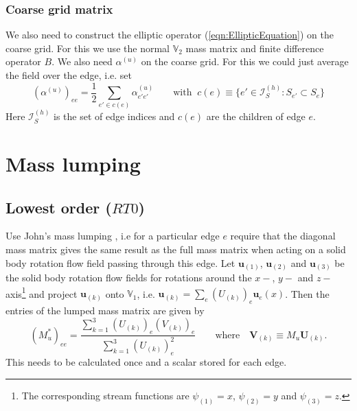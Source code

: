 \documentclass[12pt]{article}
\renewcommand{\vec}[1]{\boldsymbol{#1}}
\newcommand{\Vpressure}{\mathbb{V}_2}
\newcommand{\Vvelocity}{\mathbb{V}_1}
\newcommand{\indexSet}{\mathcal{I}}
\begin{document}
\subsubsection{Coarse grid matrix}
We also need to construct the elliptic operator (\ref{eqn:EllipticEquation}) on the coarse grid. For this we use the normal $\Vpressure$ mass matrix and finite difference operator $B$. We also need $\alpha^{(u)}$ on the coarse grid. For this we could just average the field over the edge, i.e. set
\begin{equation}
  \left(\alpha^{(u)}\right)_{ee} = \frac{1}{2} \sum_{e'\in c(e)}\alpha^{(u)}_{e'e'} \qquad\text{with}\;\;c(e) \equiv \{e'\in \indexSet_S^{(h)}:S_{e'}\subset S_{e}\}
\end{equation}
Here $\indexSet_S^{(h)}$ is the set of edge indices and $c(e)$ are the children of edge $e$.
\appendix
\section{Mass lumping}\label{sec:MassLumping}

\subsection{Lowest order ($RT0$)}
Use John's mass lumping \cite{Thuburn2013}, i.e for a particular edge $e$ require that the diagonal mass matrix gives the same result as the full mass matrix when acting on a solid body rotation flow field passing through this edge. Let $\vec{u}_{(1)}$, $\vec{u}_{(2)}$ and $\vec{u}_{(3)}$ be the solid body rotation flow fields for rotations around the $x-$, $y-$ and $z-$ axis\footnote{The corresponding stream functions are $\psi_{(1)} = x$, $\psi_{(2)}= y$ and $\psi_{(3)}=z$.} and project $\vec{u}_{(k)}$ onto $\Vvelocity$, i.e. $\vec{u}_{(k)} = \sum_e \left(U_{(k)}\right)_e \vec{u}_e(x)$. 
Then the entries of the lumped mass matrix are given by
\begin{equation}
  \left(M^*_{u}\right)_{ee} = \frac{\sum_{k=1}^3 \left(U_{(k)}\right)_e\left(V_{(k)}\right)_e}{\sum_{k=1}^3 \left(U_{(k)}\right)^2_e} \qquad
  \text{where}\quad \vec{V}_{(k)} \equiv M_{u} \vec{U}_{(k)}.
\end{equation}
This needs to be calculated once and a scalar stored for each edge.
\end{document}
